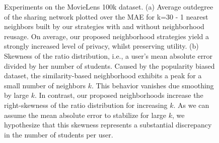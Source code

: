 \documentclass[manuscript,review,anonymous]{acmart}
\begin{document}
\begin{figure}[!htb]
    \centering
    \caption{Experiments on the MovieLens 100k dataset. (a) Average outdegree of the sharing network plotted over the MAE for k=30 - 1 nearest neighbors built by our strategies with and without neighborhood reusage. 
    On average, our proposed neighborhood strategies yield a strongly increased level of privacy, whilst preserving utility. (b) Skewness of the ratio distribution, i.e., a user's mean absolute error divided by her number of students. Caused by the popularity biased dataset, the similarity-based neighborhood exhibits a peak for a small number of neighbors $k$. This behavior vanishes due smoothing by large $k$.
    In contrast, our proposed neighborhoods increase the right-skewness of the ratio distribution for increasing $k$.
    As we can assume the mean absolute error to stabilize for large $k$, we hypothesize that this skewness represents a substantial discrepancy in the number of students per user.}
\end{figure}
\end{document}
